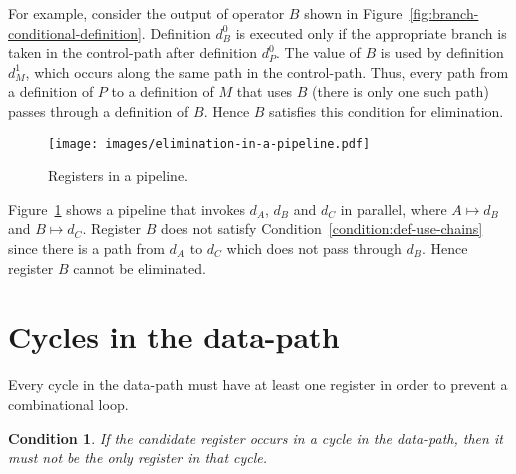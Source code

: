 \documentclass[a4paper,12pt]{article}
\newtheorem{condition}{Condition}
\begin{document}
For example, consider the output of operator $B$ shown in
Figure~\ref{fig:branch-conditional-definition}. Definition $d^0_B$ is
executed only if the appropriate branch is taken in the control-path
after definition $d^0_P$. The value of $B$ is used by definition
$d^1_M$, which occurs along the same path in the control-path. Thus,
every path from a definition of $P$ to a definition of $M$ that uses
$B$ (there is only one such path) passes through a definition of $B$.
Hence $B$ satisfies this condition for elimination.

\begin{figure}[htb]
  \centering
  \texttt{[image: images/elimination-in-a-pipeline.pdf]}
  \caption{Registers in a pipeline.}
  \label{fig:pipeline-registers}
\end{figure}

Figure~\ref{fig:pipeline-registers} shows a pipeline that invokes
$d_A$, $d_B$ and $d_C$ in parallel, where $A\mapsto d_B$ and $B\mapsto
d_C$. Register $B$ does not satisfy
Condition~\ref{condition:def-use-chains} since there is a path from
$d_A$ to $d_C$ which does not pass through $d_B$. Hence register $B$
cannot be eliminated.

\section{Cycles in the data-path}
\label{sec:data-path-cycles}

Every cycle in the data-path must have at least one register in order
to prevent a combinational loop.

\begin{condition}
  \label{condition:data-path-cycles}
  If the candidate register occurs in a cycle in the data-path, then
  it must not be the only register in that cycle.
\end{condition}
\end{document}
